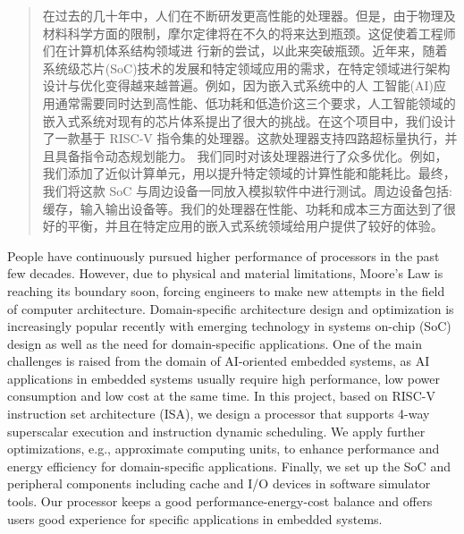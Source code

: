 
\begin{abstract}
{
在过去的几十年中，人们在不断研发更高性能的处理器。但是，由于物理及材料科学方面的限制，摩尔定律将在不久的将来达到瓶颈。这促使着工程师们在计算机体系结构领域进 行新的尝试，以此来突破瓶颈。近年来，随着系统级芯片(SoC)技术的发展和特定领域应用的需求，在特定领域进行架构设计与优化变得越来越普遍。例如，因为嵌入式系统中的人 工智能(AI)应用通常需要同时达到高性能、低功耗和低造价这三个要求，人工智能领域的嵌入式系统对现有的芯片体系提出了很大的挑战。在这个项目中，我们设计了一款基于 RISC-V 指令集的处理器。这款处理器支持四路超标量执行，并且具备指令动态规划能力。 我们同时对该处理器进行了众多优化。例如，我们添加了近似计算单元，用以提升特定领域的计算性能和能耗比。最终，我们将这款 SoC 与周边设备一同放入模拟软件中进行测试。周边设备包括:缓存，输入输出设备等。我们的处理器在性能、功耗和成本三方面达到了很好的平衡，并且在特定应用的嵌入式系统领域给用户提供了较好的体验。
}

\end{abstract}

{
\setlength{\parindent}{0pt}
\setlength{\parskip}{1em}

\begin{abstract*}

{
People have continuously pursued higher performance of processors in the past few decades. However, due to physical and material limitations, Moore's Law is reaching its boundary soon, forcing engineers to make new attempts in the field of computer architecture. Domain-specific architecture design and optimization is increasingly popular recently with emerging technology in systems on-chip (SoC) design as well as the need for domain-specific applications. One of the main challenges is raised from the domain of AI-oriented embedded systems, as AI applications in embedded systems usually require high performance, low power consumption and low cost at the same time. In this project, based on RISC-V instruction set architecture (ISA), we design a processor that supports 4-way superscalar execution and instruction dynamic scheduling. We apply further optimizations, e.g., approximate computing units, to enhance performance and energy efficiency for domain-specific applications. Finally, we set up the SoC and peripheral components including cache and I/O devices in software simulator tools. Our processor keeps a good performance-energy-cost balance and offers users good experience for specific applications in embedded systems.
}

\end{abstract*}

}